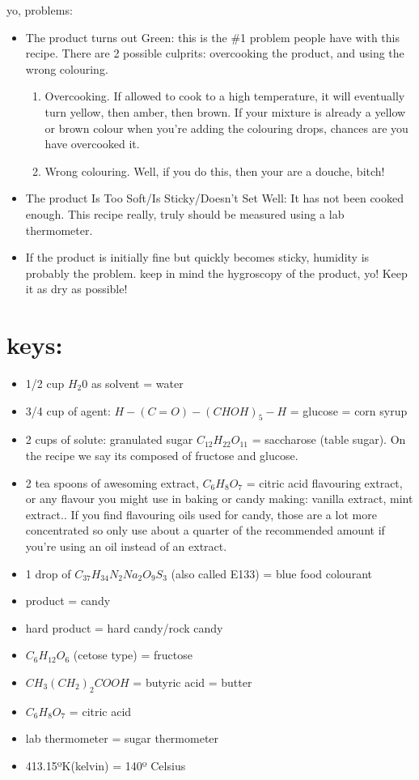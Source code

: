 \documentclass[a4paper,10pt]{article}
\begin{document}
yo, problems:
\begin{itemize}
 \item The product turns out Green: this is the \#1 problem people have with this
  recipe. There are 2 possible culprits: overcooking the product, and using the
  wrong colouring. 
  \begin{enumerate}
   \item Overcooking.  If allowed to cook to a high temperature, it
  will eventually turn yellow, then amber, then brown. If your mixture is already
  a yellow or brown colour when you’re adding the colouring drops, chances are you
  have overcooked it. 
  \item  Wrong colouring. Well, if you do this, then your are a
  douche, bitch!
  \end{enumerate}

  \item The product Is Too Soft/Is Sticky/Doesn’t Set Well: It has not been cooked
enough. This recipe really, truly should be measured using a lab thermometer.
  \item If the product is initially fine but quickly becomes sticky, humidity is
probably the problem. keep in mind the hygroscopy of the product, yo! Keep it as
dry as possible!
\end{itemize}
\normalfont

\newpage
\section*{keys:} 
\begin{itemize}  
    \item 1/2 cup $H_{2}0$ as solvent = water  
    \item 3/4 cup of agent: $H-(C=O)-(CHOH)_{5}-H$ = glucose = corn syrup  
    \item 2 cups of solute:  granulated sugar $C_{12}H_{22}O_{11}$ = saccharose (table sugar). On the recipe we
    say its composed of fructose and glucose.  
    \item 2 tea spoons of awesoming
    extract, $C_{6}H_{8}O_{7}$ = citric acid flavouring extract, or any flavour you might use in
    baking or candy making: vanilla extract, mint extract.. If you find flavouring
    oils used for candy, those are a lot more concentrated so only use about a
    quarter of the recommended amount if you’re using an oil instead of an extract.
    \item 1 drop of $C_{37}H_{34}N_{2}Na_{2}O_{9}S_{3}$ (also called E133) = blue food colourant  
    \item product = candy  
    \item hard product = hard candy/rock candy  
    \item $C_{6}H_{12}O_{6}$ (cetose type) = fructose  
    \item $CH_{3}(CH_{2})_{2}COOH$ = butyric acid = butter  
    \item $C_{6}H_{8}O_{7}$ = citric acid  
    \item lab thermometer = sugar thermometer 
    \item 413.15ºK(kelvin) = 140º Celsius 
\end{itemize}
\end{document}
